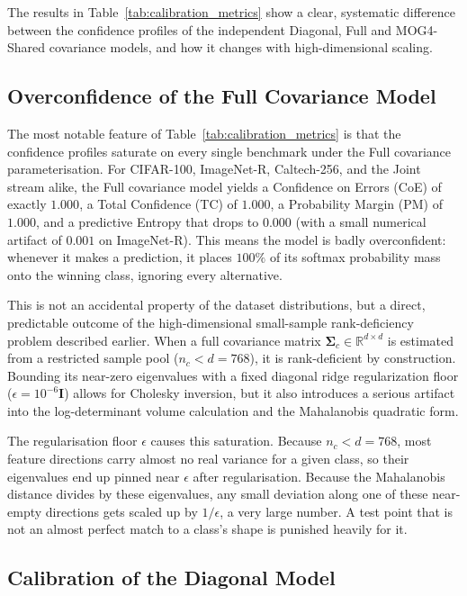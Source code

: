The results in Table~\ref{tab:calibration_metrics} show a clear, systematic difference between the confidence profiles of the independent Diagonal, Full and MOG4-Shared covariance models, and how it changes with high-dimensional scaling.

\subsection{Overconfidence of the Full Covariance Model}
\label{sec:calibration:full_pathology}

The most notable feature of Table~\ref{tab:calibration_metrics} is that the confidence profiles saturate on every single benchmark under the Full covariance parameterisation. For CIFAR-100, ImageNet-R, Caltech-256, and the Joint stream alike, the Full covariance model yields a Confidence on Errors (CoE) of exactly $1.000$, a Total Confidence (TC) of $1.000$, a Probability Margin (PM) of $1.000$, and a predictive Entropy that drops to $0.000$ (with a small numerical artifact of $0.001$ on ImageNet-R). This means the model is badly overconfident: whenever it makes a prediction, it places $100\%$ of its softmax probability mass onto the winning class, ignoring every alternative.

This is not an accidental property of the dataset distributions, but a direct, predictable outcome of the high-dimensional small-sample rank-deficiency problem described earlier. When a full covariance matrix $\mathbf{\Sigma}_c \in \mathbb{R}^{d \times d}$ is estimated from a restricted sample pool ($n_c < d = 768$), it is rank-deficient by construction. Bounding its near-zero eigenvalues with a fixed diagonal ridge regularization floor ($\epsilon = 10^{-6}\mathbf{I}$) allows for Cholesky inversion, but it also introduces a serious artifact into the log-determinant volume calculation and the Mahalanobis quadratic form.

The regularisation floor $\epsilon$ causes this saturation. Because $n_c < d = 768$, most feature directions carry almost no real variance for a given class, so their eigenvalues end up pinned near $\epsilon$ after regularisation. Because the Mahalanobis distance divides by these eigenvalues, any small deviation along one of these near-empty directions gets scaled up by $1/\epsilon$, a very large number. A test point that is not an almost perfect match to a class's shape is punished heavily for it.


\subsection{Calibration of the Diagonal Model}
\label{sec:calibration:diagonal_honesty}

